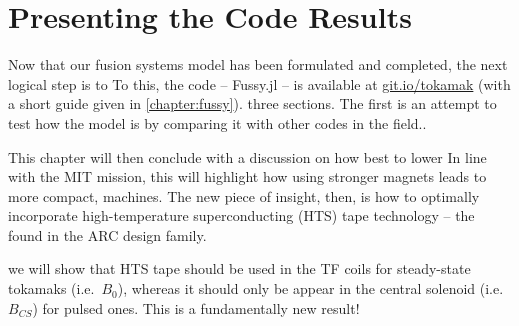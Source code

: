 %
%
%
%
%
%
%
%

\chapter{Presenting the Code Results}

Now that our fusion systems model has been formulated and completed, the next logical step is to  To this, the code  -- Fussy.jl -- is available at \href{http://git.io/tokamak}{git.io/tokamak} (with a short guide given in \cref{chapter:fussy}).  three sections. The first is an attempt to test how  the model is by comparing it with other codes in the field.\cite{arc,eupulsed,process}. 

This chapter will then conclude with a discussion on how best to lower  In line with the MIT mission, this will highlight how using stronger magnets leads to more compact,  machines. The new piece of insight, then, is how to optimally incorporate high-temperature superconducting (HTS) tape technology -- the  found in the ARC design family. 

 we will show that HTS tape should be used in the TF coils for steady-state tokamaks (i.e.\ $B_0$), whereas it should only be appear in the central solenoid (i.e.\ $B_{CS}$) for pulsed ones. This is a fundamentally new result!

